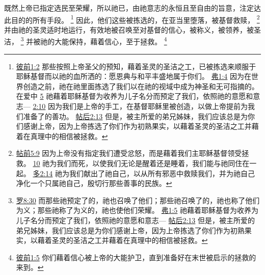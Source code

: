 \documentclass[12pt, a4paper, oneside]{ctexart}
\newcounter{parnum}[section]
\newcommand{\N}{%
   \noindent\refstepcounter{parnum}%
    \makebox[\parindent][l]{\textbf{\arabic{parnum}.}}}
\begin{document}
	
\N 既然上帝已指定选民至荣耀，所以祂已，由祂意志的永恒且至自由的旨意，注定达此目的的所有手段。
	\footnote {
		\href{https://biblehub.com/1_peter/1-2.htm}{彼前1:2} 那些按照上帝圣父的预知，藉着圣灵的圣洁之工，已被拣选来顺服于耶稣基督而以祂的血所洒的：愿恩典与和平丰盛地属于你们。
		\href{https://biblehub.com/ephesians/1-4.htm}{弗1:4} 因为在世界创造之前，祂在祂里面拣选了我们以在祂的视域中成为神圣和无可指摘的。在爱中
		\href{https://biblehub.com/ephesians/1-5.htm}{5} 祂藉着耶稣基督为收养为儿子名分而预定了我们，依照祂的意愿和意志---
		\href{https://biblehub.com/ephesians/2-10.htm}{2:10} 因为我们是上帝的手工，在基督耶稣里被创造，以做上帝提前为我们准备了的善功。
		\href{https://biblehub.com/2_thessalonians/2-13.htm}{帖后2:13} 但是，被主所爱的弟兄姊妹，我们应该总是为你们感谢上帝，因为上帝拣选了你们作为初熟果实，以藉着圣灵的圣洁之工并藉着在真理中的相信被拯救。
	}
	因此，他们这些被拣选的，在亚当里堕落，被基督救赎，
	\footnote {
		\href{https://biblehub.com/1_thessalonians/5-9.htm}{帖前5:9} 因为上帝没有指定我们遭受忿怒，而是藉着我们主耶稣基督领受拯救。
		\href{https://biblehub.com/1_thessalonians/5-10.htm}{10} 祂为我们而死，以使我们无论是醒着还是睡着，我们能与祂同住在一起。
		\href{https://biblehub.com/titus/2-14.htm}{多2:14} 祂为我们献出了祂自己，以从所有邪恶中救赎我们，并为祂自己净化一个只属祂自己，殷切行那些善事的民族。
	}
	并由祂的圣灵适时地运行，有效地被召唤至对基督的信心，被称义，被领养，被圣洁，
	\footnote {
		\href{https://biblehub.com/romans/8-30.htm}{罗8:30} 而那些祂预定了的，祂也召唤了他们；那些祂召唤了的，祂也称了他们为义；那些祂称了为义的，祂也使他们荣耀。
		\href{https://biblehub.com/ephesians/1-5.htm}{弗1:5} 祂藉着耶稣基督为收养为儿子名分而预定了我们，依照祂的意愿和意志---
		\href{https://biblehub.com/2_thessalonians/2-13.htm}{帖后2:13} 但是，被主所爱的弟兄姊妹，我们应该总是为你们感谢上帝，因为上帝拣选了你们作为初熟果实，以藉着圣灵的圣洁之工并藉着在真理中的相信被拯救。
	}
	并被祂的大能保持，藉着信心，至于拯救。
	\footnote {
		\href{https://biblehub.com/1_peter/1-5.htm}{彼前1:5} 你们藉着信心被上帝的大能护卫，直到准备好在末世被启示的拯救的来到。
	}
\end{document}
